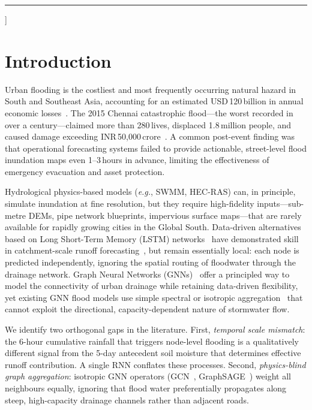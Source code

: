 \documentclass[10pt,twocolumn]{article}
\begin{document}
{\begin{@twocolumnfalse}
\begin{abstract}
\smallskip\noindent\textbf{Keywords:} Flood Forecasting, Graph Attention
Networks, Spatiotemporal Learning, Urban Hydrology, Physics-Informed
Machine Learning, Uncertainty Quantification.
\end{abstract}
\vspace{6pt}
\hrule
\vspace{10pt}

\end{@twocolumnfalse}
}]

\section{Introduction}
\label{sec:intro}

Urban flooding is the costliest and most frequently occurring natural hazard
in South and Southeast Asia, accounting for an estimated USD\,120\,billion in
annual economic losses~\cite{undrr2020}.
The 2015 Chennai catastrophic flood---the worst recorded in over a
century---claimed more than 280\,lives, displaced 1.8\,million people, and
caused damage exceeding INR\,50{,}000\,crore~\cite{imd2016}.
A common post-event finding was that operational forecasting systems failed
to provide actionable, street-level flood inundation maps even 1--3\,hours
in advance, limiting the effectiveness of emergency evacuation and asset
protection.

Hydrological physics-based models (\emph{e.g.}, SWMM, HEC-RAS) can, in
principle, simulate inundation at fine resolution, but they require
high-fidelity inputs---sub-metre DEMs, pipe network blueprints, impervious
surface maps---that are rarely available for rapidly growing cities in the
Global South.
Data-driven alternatives based on Long Short-Term Memory (LSTM)
networks~\cite{hochreiter1997} have demonstrated skill in catchment-scale
runoff forecasting~\cite{kratzert2018}, but remain essentially local: each
node is predicted independently, ignoring the spatial routing of floodwater
through the drainage network.
Graph Neural Networks (GNNs)~\cite{zhou2020gnn,velickovic2018gat} offer a
principled way to model the connectivity of urban drainage while retaining
data-driven flexibility, yet existing GNN flood models use simple spectral
or isotropic aggregation~\cite{bentivoglio2023,berkhahn2019} that cannot
exploit the directional, capacity-dependent nature of stormwater flow.

We identify two orthogonal gaps in the literature.
First, \emph{temporal scale mismatch}: the 6-hour cumulative rainfall that
triggers node-level flooding is a qualitatively different signal from the
5-day antecedent soil moisture that determines effective runoff contribution.
A single RNN conflates these processes.
Second, \emph{physics-blind graph aggregation}: isotropic GNN operators
(GCN~\cite{kipf2017}, GraphSAGE~\cite{hamilton2017}) weight all neighbours
equally, ignoring that flood water preferentially propagates along steep,
high-capacity drainage channels rather than adjacent roads.
\end{document}
